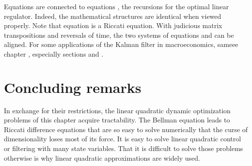 Equations
  are connected   to equations
 , the recursions for the optimal
linear regulator.  Indeed, the mathematical structures are identical when viewed properly.
Note that equation  is
a Riccati equation.   With  judicious 
matrix transpositions and reversals of time, the two systems of equations
 and 
can be aligned. %
For some applications of the Kalman filter in macroeconomics, sameee chapter , especially sections  and .
%
%




\section{Concluding remarks}

In exchange for their restrictions,
 the linear quadratic dynamic optimization problems of
this chapter acquire  tractability.     The Bellman
equation leads to Riccati difference  equations that
are so  easy to solve numerically that the curse of
dimensionality loses most of its force.  It is easy
to solve linear quadratic control or filtering with many state variables.
That it is difficult to solve  those problems otherwise is why
linear quadratic approximations are widely used.

